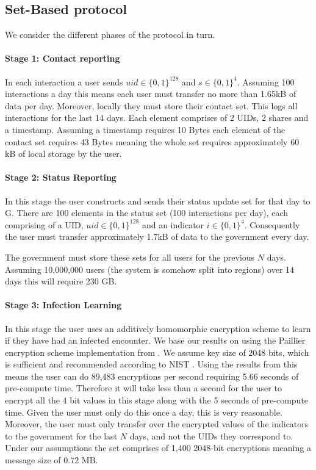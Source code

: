 \documentclass{article}
\begin{document}
\subsection{Set-Based protocol}

We consider the different phases of the protocol in turn.

\paragraph{Stage 1: Contact reporting}

In each interaction a user sends $uid \in \{0,1\}^{128}$ and $s \in \{0,1\}^4$. Assuming 100 interactions a day this means each user must transfer no more than 1.65kB of data per day. Moreover, locally they must store their contact set. This logs all interactions for the last 14 days. Each element comprises of 2 UIDs, 2 shares and a timestamp. Assuming a timestamp requires 10 Bytes each element of the contact set requires 43 Bytes meaning the whole set requires approximately 60 kB of local storage by the user.

\paragraph{Stage 2: Status Reporting}

In this stage the user constructs and sends their status update set for that day to G. There are 100 elements in the status set (100 interactions per day), each comprising of a UID, $uid \in \{0,1\}^{128}$ and an indicator $i \in \{0,1\}^4$. Consequently the user must transfer approximately 1.7kB of data to the government every day. 

The government must store these sets for all users for the previous $N$ days. Assuming 10,000,000 users (the system is somehow split into regions) over 14 days this will require 230 GB. 

\paragraph{Stage 3: Infection Learning}

In this stage the user uses an additively homomorphic encryption scheme to learn if they have had an infected encounter. We base our results on using the Paillier encryption scheme implementation from \cite{DBLP:journals/iacr/JostLMS15}. We assume key size of 2048 bits, which is sufficient and recommended according to NIST \cite{NIST}. Using the results from \cite{DBLP:journals/iacr/JostLMS15} this means the user can do 89,483 encryptions per second requiring 5.66 seconds of pre-compute time. Therefore it will take less than a second for the user to encrypt all the 4 bit values in this stage along with the 5 seconds of pre-compute time. Given the user must only do this once a day, this is very reasonable. Moreover, the user must only transfer over the encrypted values of the indicators to the government for the last $N$ days, and not the UIDs they correspond to. Under our assumptions the set comprises of 1,400 2048-bit encryptions meaning a message size of 0.72 MB.\\  
\end{document}
